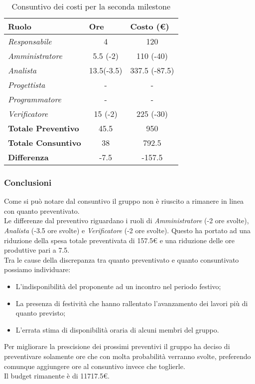 \begin{table}[H]
    \centering
    \begin{tabular}{|l|c|c|}
    \hline
    \textbf{Ruolo} & \multicolumn{1}{l|}{\textbf{Ore}} & \multicolumn{1}{l|}{\textbf{Costo (€)}} \\ \hline
    \textit{Responsabile}      & 4         & 120         \\ \hline
    \textit{Amministratore}    & 5.5 (-2)  & 110 (-40)   \\ \hline
    \textit{Analista}          & 13.5(-3.5)  & 337.5 (-87.5) \\ \hline
    \textit{Progettista}       & -         & -           \\ \hline
    \textit{Programmatore}     & -         & -           \\ \hline
    \textit{Verificatore}      & 15 (-2)   & 225 (-30)   \\ \hline
    \textbf{Totale Preventivo} & 45.5      & 950         \\ \hline
    \textbf{Totale Consuntivo} & 38        & 792.5       \\ \hline
    \textbf{Differenza}        & -7.5      & -157.5      \\ \hline
    \end{tabular}
    \caption{Consuntivo dei costi per la seconda milestone}
\end{table}

\subsubsection{Conclusioni}
Come si può notare dal consuntivo il gruppo non è riuscito a rimanere in linea con quanto preventivato.
\\Le differenze dal preventivo riguardano i ruoli di \textit{Amministratore} (-2 ore svolte), \textit{Analista} (-3.5 ore svolte) e \textit{Verificatore} (-2 ore svolte).
Questo ha portato ad una riduzione della spesa totale preventivata di 157.5€ e una riduzione delle ore produttive pari a 7.5.
\\Tra le cause della discrepanza tra quanto preventivato e quanto consuntivato possiamo individuare:
    \begin{itemize}
        \item L'indisponibilità del proponente ad un incontro nel periodo festivo;
        \item La presenza di festività che hanno rallentato l'avanzamento dei lavori più di quanto previsto;
        \item L'errata stima di disponibilità oraria di alcuni membri del gruppo.
    \end{itemize}
Per migliorare la prescisione dei prossimi preventivi il gruppo ha deciso di preventivare solamente ore che con molta probabilità verranno svolte,
preferendo comunque aggiungere ore al consuntivo invece che toglierle.
\\Il budget rimanente è di \num{11717,5}€.



